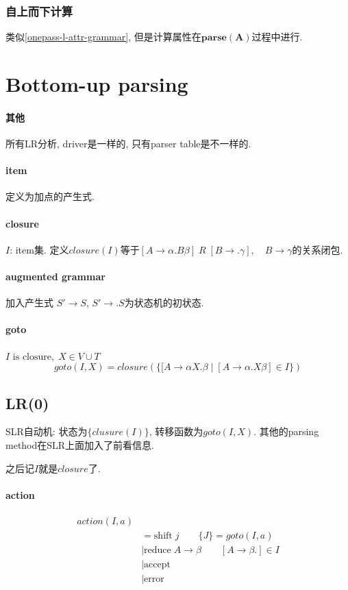 \documentclass{ctexart}
\begin{document}
\subsubsection{自上而下计算} 类似\ref{onepass-l-attr-grammar}, 但是计算属性在$\mathbf{parse(A)}$过程中进行.

\pagebreak
\section{Bottom-up parsing}
\paragraph{其他} 所有LR分析, driver是一样的, 只有parser table是不一样的.
\paragraph{item} 定义为加点的产生式.
\paragraph{closure} $I$: item集. 定义$closure(I)$等于$[A \to \alpha . B \beta] \;R\; [B \to .\gamma],\quad B \to \gamma$的关系闭包.
\paragraph{augmented grammar} 加入产生式 $S' \to S$, $S' \to .S$为状态机的初状态.
\paragraph{goto} $I \text{ is closure},\;X \in V \cup T$\[
    goto(I, X) = closure(\{[A \to \alpha X .\beta \;|\; [A \to \alpha . X \beta] \in I\})\]
\subsection{LR(0)}
    SLR自动机: 状态为$\{ clusure(I) \}$, 转移函数为$goto(I, X)$.
    其他的parsing method在SLR上面加入了前看信息.\par
    之后记$I$就是$closure$了.
\paragraph{action} \begin{align*}action(I, a)&\\
    &= \text{shift}\; j \qquad \{J\} = goto(I, a)\\
    &| \text{reduce}\; A\to\beta \qquad [A \to \beta.] \in I\\
    &| \text{accept}\\
    &| \text{error}\end{align*}
\end{document}
